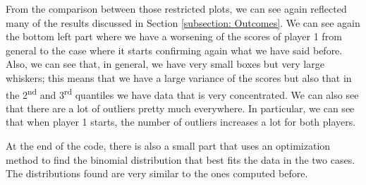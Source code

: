From the comparison between those restricted plots, we can see again reflected many of the results discussed in Section \ref{subsection: Outcomes}.
We can see again the bottom left part where we have a worsening of the scores of player 1 from general to the case where it starts confirming again what we have said before. 
Also, we can see that, in general, we have very small boxes but very large whiskers; this means that we have a large variance of the scores but also that in the 2\textsuperscript{nd} and 3\textsuperscript{rd} quantiles we have data that is very concentrated. We can also see that there are a lot of outliers pretty much everywhere. In particular, we can see that when player 1 starts, the number of outliers increases a lot for both players.

At the end of the code, there is also a small part that uses an optimization method to find the binomial distribution that best fits the data in the two cases. The distributions found are very similar to the ones computed before.